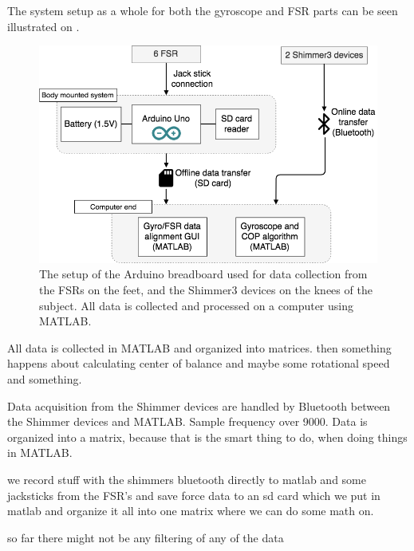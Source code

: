 The system setup as a whole for both the gyroscope and FSR parts can be seen illustrated on .

\begin{figure}[H]
	\includegraphics[width=.6\textwidth]{figures/heleSystemSetup}
	\caption{The setup of the Arduino breadboard used for data collection from the FSRs on the feet, and the Shimmer3 devices on the knees of the subject. All data is collected and processed on a computer using MATLAB.}
	\label{fig:heleSystemSetup}  %
\end{figure}





All data is collected in MATLAB and organized into matrices. then something happens about calculating center of balance and maybe some rotational speed and something. 

Data acquisition from the Shimmer devices are handled by Bluetooth between the Shimmer devices and MATLAB. Sample frequency over 9000. Data is organized into a matrix, because that is the smart thing to do, when doing things in MATLAB.





we record stuff with the shimmers bluetooth directly to matlab and some jacksticks from the FSR's and save force data to an sd card which we put in matlab and organize it all into one matrix where we can do some math on. 

so far there might not be any filtering of any of the data







